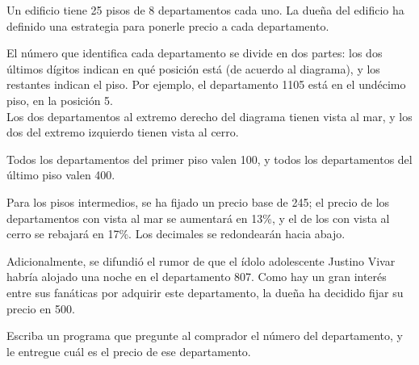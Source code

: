Un edificio tiene 25 pisos de 8 departamentos cada uno.
La dueña del edificio ha definido una estrategia
para ponerle precio a cada departamento.

\begin{minipage}[T]{.71\textwidth}
  El número que identifica cada departamento se divide en dos partes:
  los dos últimos dígitos indican en qué posición está
  (de acuerdo al dia\-grama),
  y los restantes indican el piso.
  Por ejemplo, el departamento 1105 está en el undécimo piso,
  en la posición 5.
  \\[.6ex]
  Los dos departamentos al extremo derecho del diagrama
  tienen vista al mar,
  y los dos del extremo izquierdo
  tienen vista al cerro.
\end{minipage}
\hspace{1em}
\begin{minipage}[T]{.25\textwidth}
\end{minipage}

Todos los departamentos del primer piso valen 100,
y todos los departamentos del último piso valen 400.

Para los pisos intermedios,
se ha fijado un precio base de 245;
el precio de los departamentos con vista al mar se aumentará en 13\%,
y el de los con vista al cerro se rebajará en 17\%.
Los decimales se redondearán hacia abajo.

Adicionalmente,
se difundió el rumor de que el ídolo adolescente Justino Vivar
habría alojado una noche en el departamento 807.
Como hay un gran interés entre sus fanáticas
por adquirir este departamento,
la dueña ha decidido fijar su precio en 500.

Escriba un programa que pregunte al comprador el número del departamento,
y le entregue cuál es el precio de ese departamento.

